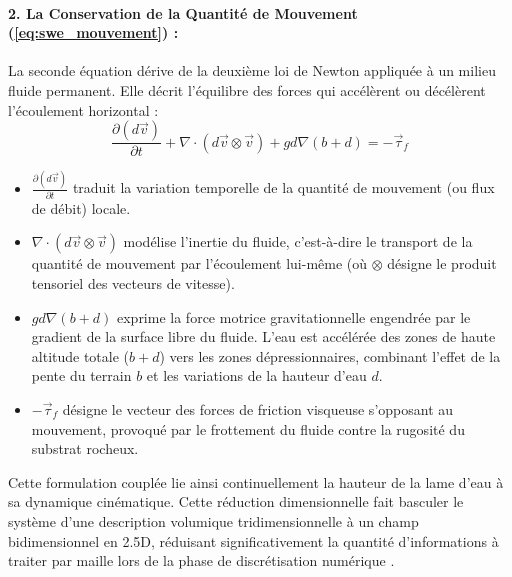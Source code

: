 \documentclass[10pt,twocolumn,a4paper]{article}
\begin{document}
\paragraph{2. La Conservation de la Quantité de Mouvement (\ref{eq:swe_mouvement}) :}
La seconde équation dérive de la deuxième loi de Newton appliquée à un milieu fluide permanent. Elle décrit l'équilibre des forces qui accélèrent ou décélèrent l'écoulement horizontal :
\begin{equation}\label{eq:swe_mouvement}
    \frac{\partial (d \vec{v})}{\partial t} + \nabla \cdot (d \vec{v} \otimes \vec{v}) + g d \nabla(b+d) = -\vec{\tau}_f
\end{equation}
\begin{itemize}
    \item $\frac{\partial (d \vec{v})}{\partial t}$ traduit la variation temporelle de la quantité de mouvement (ou flux de débit) locale.
    \item $\nabla \cdot (d \vec{v} \otimes \vec{v})$ modélise l'inertie du fluide, c'est-à-dire le transport de la quantité de mouvement par l'écoulement lui-même (où $\otimes$ désigne le produit tensoriel des vecteurs de vitesse).
    \item $g d \nabla(b+d)$ exprime la force motrice gravitationnelle engendrée par le gradient de la surface libre du fluide. L'eau est accélérée des zones de haute altitude totale ($b+d$) vers les zones dépressionnaires, combinant l'effet de la pente du terrain $b$ et les variations de la hauteur d'eau $d$.
    \item $-\vec{\tau}_f$ désigne le vecteur des forces de friction visqueuse s'opposant au mouvement, provoqué par le frottement du fluide contre la rugosité du substrat rocheux.
\end{itemize}

Cette formulation couplée lie ainsi continuellement la hauteur de la lame d'eau à sa dynamique cinématique. Cette réduction dimensionnelle fait basculer le système d'une description volumique tridimensionnelle à un champ bidimensionnel en 2.5D, réduisant significativement la quantité d'informations à traiter par maille lors de la phase de discrétisation numérique \cite{MDH07}.
\end{document}
